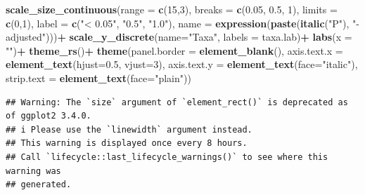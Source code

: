 \documentclass[
]{article}
\newenvironment{Shaded}{\begin{snugshade}}{\end{snugshade}}
\newcommand{\AttributeTok}[1]{\textcolor[rgb]{0.13,0.29,0.53}{#1}}
\newcommand{\DecValTok}[1]{\textcolor[rgb]{0.00,0.00,0.81}{#1}}
\newcommand{\FloatTok}[1]{\textcolor[rgb]{0.00,0.00,0.81}{#1}}
\newcommand{\FunctionTok}[1]{\textcolor[rgb]{0.13,0.29,0.53}{\textbf{#1}}}
\newcommand{\NormalTok}[1]{#1}
\newcommand{\SpecialCharTok}[1]{\textcolor[rgb]{0.81,0.36,0.00}{\textbf{#1}}}
\newcommand{\StringTok}[1]{\textcolor[rgb]{0.31,0.60,0.02}{#1}}
\begin{document}
\begin{Shaded}
\begin{Highlighting}[]
    \FunctionTok{scale\_size\_continuous}\NormalTok{(}\AttributeTok{range =} \FunctionTok{c}\NormalTok{(}\DecValTok{15}\NormalTok{,}\DecValTok{3}\NormalTok{), }\AttributeTok{breaks =} \FunctionTok{c}\NormalTok{(}\FloatTok{0.05}\NormalTok{, }\FloatTok{0.5}\NormalTok{, }\DecValTok{1}\NormalTok{), }\AttributeTok{limits =} \FunctionTok{c}\NormalTok{(}\DecValTok{0}\NormalTok{,}\DecValTok{1}\NormalTok{), }
                          \AttributeTok{label =} \FunctionTok{c}\NormalTok{(}\StringTok{"\textless{} 0.05"}\NormalTok{, }\StringTok{"0.5"}\NormalTok{, }\StringTok{"1.0"}\NormalTok{), }\AttributeTok{name =} \FunctionTok{expression}\NormalTok{(}\FunctionTok{paste}\NormalTok{(}\FunctionTok{italic}\NormalTok{(}\StringTok{"P"}\NormalTok{), }\StringTok{"{-}adjusted"}\NormalTok{)))}\SpecialCharTok{+}
    \FunctionTok{scale\_y\_discrete}\NormalTok{(}\AttributeTok{name=}\StringTok{"Taxa"}\NormalTok{, }\AttributeTok{labels =}\NormalTok{ taxa.lab)}\SpecialCharTok{+}
    \FunctionTok{labs}\NormalTok{(}\AttributeTok{x =} \StringTok{""}\NormalTok{)}\SpecialCharTok{+}
    \FunctionTok{theme\_rs}\NormalTok{()}\SpecialCharTok{+}
    \FunctionTok{theme}\NormalTok{(}\AttributeTok{panel.border =} \FunctionTok{element\_blank}\NormalTok{(),}
          \AttributeTok{axis.text.x =} \FunctionTok{element\_text}\NormalTok{(}\AttributeTok{hjust=}\FloatTok{0.5}\NormalTok{, }\AttributeTok{vjust=}\DecValTok{3}\NormalTok{),}
          \AttributeTok{axis.text.y =} \FunctionTok{element\_text}\NormalTok{(}\AttributeTok{face=}\StringTok{"italic"}\NormalTok{),}
          \AttributeTok{strip.text =} \FunctionTok{element\_text}\NormalTok{(}\AttributeTok{face=}\StringTok{"plain"}\NormalTok{))}
\end{Highlighting}
\end{Shaded}

\begin{verbatim}
## Warning: The `size` argument of `element_rect()` is deprecated as of ggplot2 3.4.0.
## i Please use the `linewidth` argument instead.
## This warning is displayed once every 8 hours.
## Call `lifecycle::last_lifecycle_warnings()` to see where this warning was
## generated.
\end{verbatim}
\end{document}
